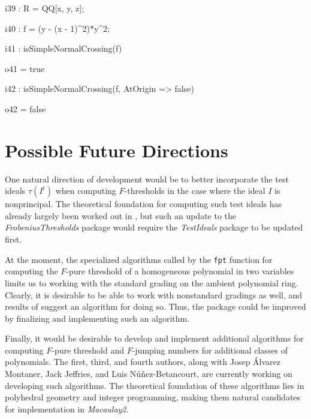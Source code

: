 \documentclass{amsart}
\begin{document}
\bigskip
{\small
{}
\begin{MyVerbatim}
i39 : R = QQ[x, y, z];

i40 : f = (y - (x - 1)^2)*y^2; 

i41 : isSimpleNormalCrossing(f)

o41 = true

i42 : isSimpleNormalCrossing(f, AtOrigin => false)

o42 = false
\end{MyVerbatim}
}
\bigskip












\section{Possible Future Directions}
\label{sec.FutureDirections}

One natural direction of development would be to better incorporate the test ideals $\tau(I^t)$ when computing $F$-thresholds in the case where the ideal $I$ is nonprincipal.
The theoretical foundation for computing such test ideals has already largely been worked out in \cite{SchwedeTuckerTestIdealsOfNonPrincipal}, but such an update to the \emph{FrobeniusThresholds} package would require the  \emph{TestIdeals} package to be updated first.

At the moment, the specialized algorithms called by the \texttt{fpt} function for computing the $F$-pure threshold of a homogeneous polynomial in two variables limits us to working with the standard grading on the ambient polynomial ring.  Clearly, it is desirable to be able to work with nonstandard gradings as well, and results of \cite{HernandezTeixeiraFThresholdFunctions} suggest an algorithm for doing so.  Thus, the package could be improved by finalizing and implementing such an algorithm.

Finally, it would be desirable to develop and implement additional algorithms for computing $F$-pure threshold and $F$-jumping numbers for additional classes of polynomials.  The first, third, and fourth authors, along with Josep \'Alvarez Montaner, Jack Jeffries, and Luis N\'u\~nez-Betancourt,  are currently working on developing such algorithms.  The theoretical foundation of these algorithms lies in polyhedral geometry and integer programming, making them natural candidates for  implementation in \emph{Macaulay2}.  




\end{document}
